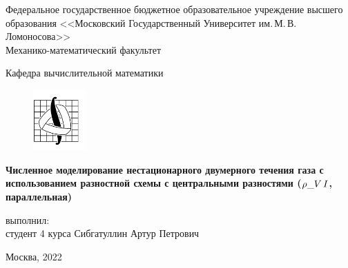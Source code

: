 \begin{titlepage}
	\begin{center}

		Федеральное государственное бюджетное образовательное учреждение высшего образования 
		<<Московский Государственный Университет им.\,М.\,В.\,Ломоносова>>\\
		
		Механико-математический факультет
		
		Кафедра вычислительной математики\\[0.6cm]
		
		\begin{figure}[!htp]
				\begin{center}
						{\includegraphics[width=20mm]{pics/mmlogo.png}}
					\end{center}
			\end{figure}
		
		\vspace{3cm}
			
		{\bf Численное моделирование нестационарного двумерного течения газа с использованием разностной схемы с центральными разностями ($\rho\_V \, \RNumb{1}$, параллельная)}
		
		\vspace{5cm}
		\begin{flushright}
			{ выполнил:}\\
			студент 4 курса Сибгатуллин Артур Петрович\\[0.5cm]
		\end{flushright}
		\vspace{1cm}
		
		\normalsize Москва, 2022
	\end{center}
\end{titlepage}
